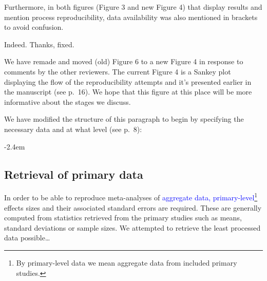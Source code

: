\documentclass[draft]{article}
\renewenvironment{quote}{\begin{fquote}\advance\leftmargini -2.4em\begin{oldquote}}{\end{oldquote}\end{fquote}}
\newenvironment{fquote}
  {\def\FrameCommand{
	\fboxsep=0.6em %
	\fcolorbox{black}{white}}%
    \MakeFramed {\advance\hsize-2\width \FrameRestore}
    \begin{minipage}{\linewidth}
  }
  {\end{minipage}\endMakeFramed}
\begin{document}
Furthermore, in both figures (Figure 3 and new Figure 4) that display results and mention process reproducibility, data availability was also mentioned in brackets to avoid confusion.


Indeed. Thanks, fixed.


We have remade and moved (old) Figure 6 to a new Figure 4 in response to comments by the other reviewers. The current Figure 4 is a Sankey plot displaying the flow of the reproducibility attempts and it's presented earlier in the manuscript (see p.~16). We hope that this figure at this place will be more informative about the stages we discuss.


We have modified the structure of this paragraph to begin by specifying the necessary data and at what level (see p.~8):

\begin{quote}
\hypertarget{retrieval-of-primary-data}{%
\subsection{Retrieval of primary data}\label{retrieval-of-primary-data}}

In order to be able to reproduce meta-analyses of \textcolor{blue}{aggregate data, primary-level}\footnote{By primary-level data we mean aggregate data from included primary studies.} effects sizes and their associated standard errors are required. These are generally computed from statistics retrieved from the primary studies such as means, standard deviations or sample sizes. We attempted to retrieve the least processed data possible\ldots{}
\end{quote}
\end{document}
